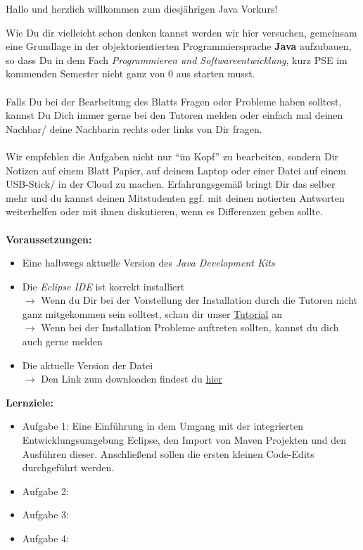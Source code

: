 

\begin{center}
	Hallo und herzlich willkommen zum diesjährigen Java Vorkurs!\\
\end{center}
Wie Du dir vielleicht schon denken kannst werden wir hier versuchen, gemeinsam eine Grundlage in der objektorientierten Programmiersprache \textbf{Java} aufzubauen, so dass Du in dem Fach \textit{Programmieren und Softwareentwicklung}, kurz PSE im kommenden Semester nicht ganz von 0 aus starten musst.\\\\
Falls Du bei der Bearbeitung des Blatts Fragen oder Probleme haben solltest, kannst Du Dich immer gerne bei den Tutoren melden oder einfach mal deinen Nachbar/ deine Nachbarin rechts oder links von Dir fragen.\\\\
Wir empfehlen die Aufgaben nicht nur \enquote{im Kopf} zu bearbeiten, sondern Dir Notizen auf einem Blatt Papier, auf deinem Laptop oder einer Datei auf einem USB-Stick/ in der Cloud zu machen. Erfahrungsgemäß bringt Dir das selber mehr und du kannst deinen Mitstudenten ggf. mit deinen notierten Antworten weiterhelfen oder mit ihnen diskutieren, wenn es Differenzen geben sollte.\\\\
\textbf{Voraussetzungen:}
\begin{itemize}
	\item Eine halbwegs aktuelle Version des \textit{Java Development Kits}
	\item Die \textit{Eclipse IDE} ist korrekt installiert\\
	$\rightarrow$ Wenn du Dir bei der Vorstellung der Installation durch die Tutoren nicht ganz mitgekommen sein solltest, schau dir unser \href{https://youtu.be/zxH3G1MTrVs}{Tutorial} an\\
	$\rightarrow$ Wenn bei der Installation Probleme auftreten sollten, kannst du dich auch gerne melden
	\item Die aktuelle Version der \texttt{\jvkpackage} Datei\\
	$\rightarrow$ Den Link zum downloaden findest du \href{\jvkpackageurl}{hier}
\end{itemize}
\textbf{Lernziele:}
\begin{itemize}
	\item Aufgabe 1: Eine Einführung in dem Umgang mit der integrierten Entwicklungsumgebung Eclipse, den Import von Maven Projekten und den Ausführen dieser. Anschließend sollen die ersten kleinen Code-Edits durchgeführt werden.
	\item Aufgabe 2:
	\item Aufgabe 3:
	\item Aufgabe 4:
\end{itemize}

